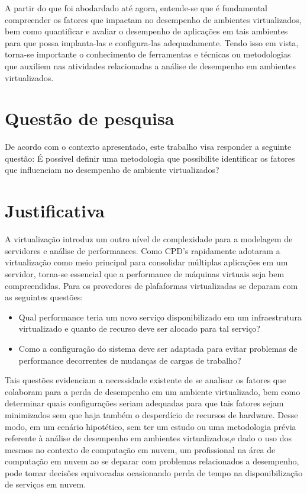 A partir do que foi abodardado até agora, entende-se que é fundamental compreender os fatores que impactam no desempenho de ambientes virtualizados, bem como quantificar e avaliar o desempenho de aplicações em tais ambientes para que possa implanta-las e configura-las adequadamente. Tendo isso em vista, torna-se importante o conhecimento de ferramentas e técnicas ou metodologias que auxiliem nas atividades relacionadas a análise de desempenho em ambientes virtualizados. 

\section{Quest\~ao de pesquisa}
De acordo com o contexto apresentado, este trabalho visa responder a seguinte questão: É possível definir uma metodologia que possibilite identificar os fatores que influenciam no desempenho de ambiente virtualizados? 

\section{Justificativa}
A virtualização introduz um outro nível de complexidade para a modelagem de servidores e análise de performances. Como CPD's rapidamente adotaram a virtualização como meio principal para consolidar múltiplas aplicações em um servidor, torna-se essencial que a performance de máquinas virtuais seja bem compreendidas\cite{ticko2010}. Para  os provedores de plafaformas virtualizadas se deparam com as seguintes questões:

\begin{itemize}
  \item Qual performance teria um novo serviço disponibilizado em um infraestrutura virtualizado e quanto de recurso deve ser alocado para tal serviço?

  \item Como a configuração do sistema deve ser adaptada para evitar problemas de performance decorrentes de mudanças de cargas de trabalho?
\end{itemize}


Tais questões evidenciam a necessidade existente de se analisar os fatores que colaboram para a perda de desempenho em um ambiente virtualizado, bem como determinar quais configurações seriam adequadas para que tais fatores sejam minimizados sem que haja também o desperdício de recursos de hardware. Desse modo, em um cenário hipotético, sem ter um estudo ou uma metodologia prévia referente à análise de desempenho em ambientes virtualizados,e dado o uso dos mesmos no contexto de computação em nuvem, um profissional na área de computação em nuvem ao se deparar com problemas relacionados a desempenho, pode tomar decisôes equivocadas ocasionando perda de tempo na disponibilização de serviços em nuvem.

